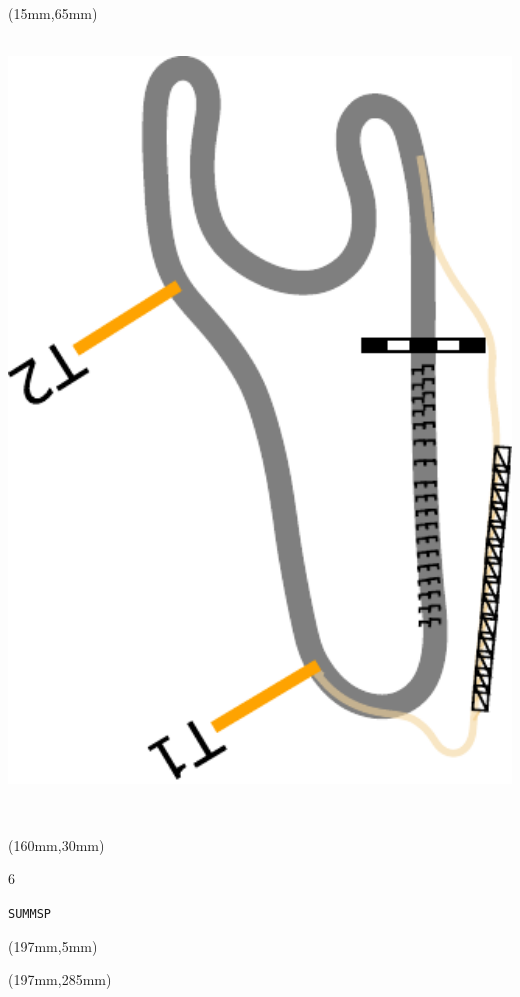 \begin{textblock*}{185mm}(15mm,65mm)%
\centering
\mbox{\includegraphics[width=185mm,height=210mm,keepaspectratio]{PT/SUMMSP.pdf}}
\end{textblock*}
\begin{textblock*}{40mm}(160mm,30mm)%
\Large
\par{} 
\par6 
\par\hfill\tiny\tt SUMMSP\\
\end{textblock*}
\begin{textblock*}{20mm}(197mm,5mm)%
\fbox{\thepage}
\label{SUMMSP}
\end{textblock*}
\begin{textblock*}{20mm}(197mm,285mm)%
\fbox{\thepage}
\end{textblock*}


